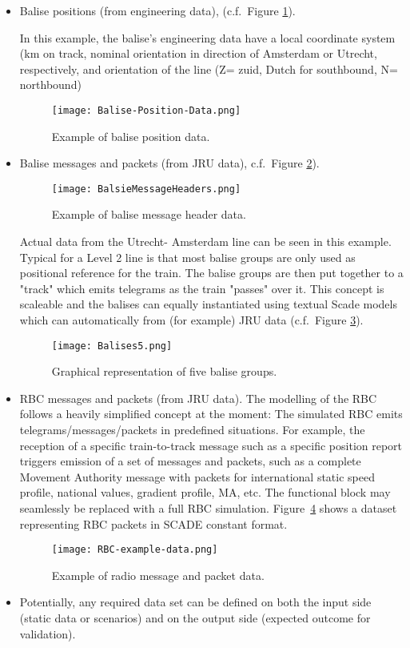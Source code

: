 \begin{itemize}
\item Balise positions (from engineering data), (c.f.~Figure \ref{fig:Balise-Position-Data}).

In this example, the balise's engineering data have a local coordinate system (km on track, nominal orientation in direction of Amsterdam or Utrecht, respectively, and orientation of the line (Z= zuid, Dutch for southbound, N= northbound)
\begin{figure}
  \centering
  \texttt{[image: Balise-Position-Data.png]}
  \caption{Example of balise position data.}
  \label{fig:Balise-Position-Data}
\end{figure}

\item Balise messages and packets (from JRU data), c.f.~Figure \ref{fig:BalsieMessageHeaders}).

\begin{figure}
  \centering
  \texttt{[image: BalsieMessageHeaders.png]}
  \caption{Example of balise message header data.}
  \label{fig:BalsieMessageHeaders}
\end{figure}

Actual data from the Utrecht- Amsterdam line can be seen in this example. Typical for a Level 2 line is that most balise groups are only used as positional reference for the train.
The balise groups are then put together to a "track" which emits telegrams as the train "passes" over it. This concept is scaleable and the balises can equally instantiated using textual Scade models which can automatically from (for example) JRU data (c.f.~Figure \ref{fig:Balises5}).
	
\begin{figure}
  \centering
  \texttt{[image: Balises5.png]}
  \caption{Graphical representation of five balise groups.}
  \label{fig:Balises5}
\end{figure}

\item RBC messages and packets (from JRU data). The modelling of the RBC follows a heavily simplified concept at the moment: The simulated RBC emits telegrams/messages/packets in predefined situations. For example, the reception of a specific train-to-track message such as a specific position report triggers emission of a set of messages and packets, such as a complete Movement Authority message with packets for international static speed profile, national values, gradient profile, MA, etc. The functional block may seamlessly be replaced with a full RBC simulation. Figure~\ref{fig:RBC-example-data} shows a dataset representing RBC packets in SCADE constant format.
\begin{figure}
  \centering
  \texttt{[image: RBC-example-data.png]}
  \caption{Example of radio message and packet data.}
  \label{fig:RBC-example-data}
\end{figure}

\item Potentially, any required data set can be defined on both the input side (static data or scenarios) and on the output side (expected outcome for validation).
\end{itemize}
